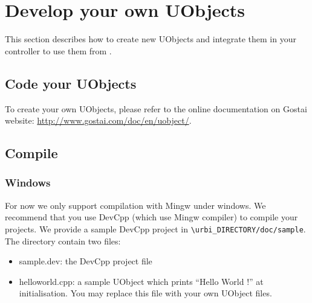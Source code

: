 
\section{Develop your own UObjects}
\label{webots.ownuobjects}%

This section describes how to create new UObjects and integrate them
in your \urbi controller to use them from .


\subsection{Code your UObjects}
\label{webots.ownuobjects.code}%

To create your own UObjects, please refer to the online documentation
on Gostai website: \url{http://www.gostai.com/doc/en/uobject/}.


\subsection{Compile}
\label{webots.ownuobjects.compile}%

\subsubsection{Windows}
\label{webots.ownuobjects.compile.windows}%

For now we only support compilation with Mingw under windows. We
recommend that you use DevCpp (which use Mingw compiler) to compile
your projects.  We provide a sample DevCpp project in
\nolinkurl{\urbi_DIRECTORY/doc/sample}.  The directory contain two
files:
\begin{itemize}
\item sample.dev: the DevCpp project file
\item helloworld.cpp: a sample UObject which prints ``Hello World !'' at
  initialisation. You may replace this file with your own UObject
  files.
\end{itemize}

